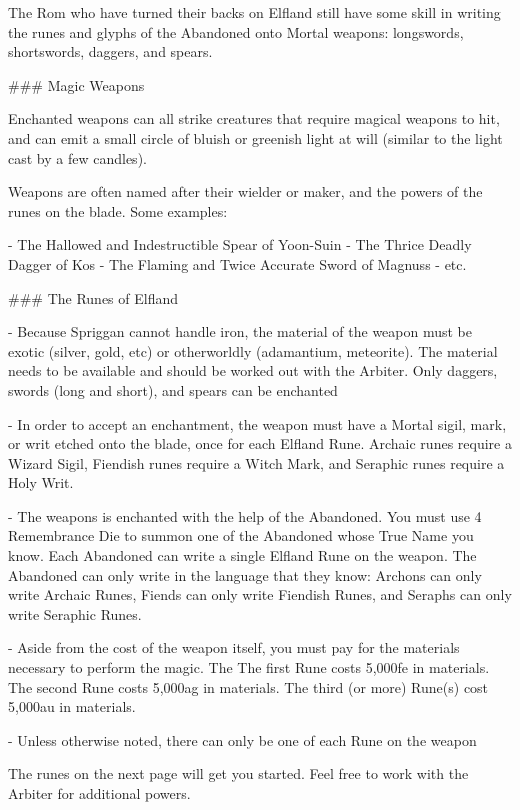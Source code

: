 The Rom who have turned their backs on Elfland still have some skill in writing the runes and glyphs of the Abandoned onto Mortal weapons: longswords, shortswords, daggers, and spears. 

### Magic Weapons

Enchanted weapons can all strike creatures that require magical weapons to hit, and can emit a small circle of bluish or greenish light at will (similar to the light cast by a few candles).

Weapons are often named after their wielder or maker, and the powers of the runes on the blade.  Some examples:

- The Hallowed and Indestructible Spear of Yoon-Suin
- The Thrice Deadly Dagger of Kos
- The Flaming and Twice Accurate Sword of Magnuss
- etc.




### The Runes of Elfland

- Because Spriggan cannot handle iron, the material of the weapon must be exotic (silver, gold, etc) or otherworldly (adamantium, meteorite).  The material needs to be available and should be worked out with the Arbiter.  Only daggers, swords (long and short), and spears can be enchanted

- In order to accept an enchantment, the weapon must have a Mortal sigil, mark, or writ etched onto the blade, once for each Elfland Rune.  Archaic runes require a Wizard Sigil, Fiendish runes require a Witch Mark, and Seraphic runes require a Holy Writ.

- The weapons is enchanted with the help of the Abandoned.  You must use 4 Remembrance Die to summon one of the Abandoned whose True Name you know.  Each Abandoned can write a single Elfland Rune on the weapon.  The Abandoned can only write in the language that they know:  Archons can only write Archaic Runes, Fiends can only write Fiendish Runes, and Seraphs can only write Seraphic Runes.

-  Aside from the cost of the weapon itself, you must pay for the materials necessary to perform the magic.  The 
The first Rune costs 5,000fe in materials.  The second Rune costs 5,000ag in materials.  The third (or more) Rune(s) cost 5,000au in materials.

- Unless otherwise noted, there can only be one of each Rune on the weapon
 
The runes on the next page will get you started.  Feel free to work with the Arbiter for additional powers.  



